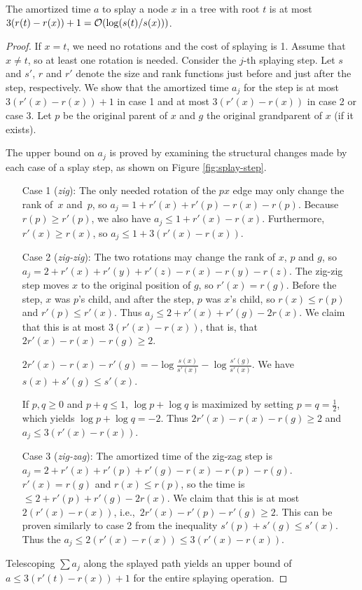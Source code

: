 \begin{lemma}
The amortized time $a$ to splay a node $x$ in a tree with root $t$
is at most $3(r(t)-r(x))+1 = \mathcal{O}(\log(s(t)/s(x)))$.
\end{lemma}
\begin{proof}
If $x=t$, we need no rotations and the cost of splaying is 1.
Assume that  $x\neq t$, so at least one rotation is needed.
Consider the $j$-th splaying step.
Let $s$ and $s'$, $r$ and $r'$ denote the size and rank functions just before
and just after the step, respectively. We show that the amortized time
$a_j$ for the step is at most $3(r'(x)-r(x))+1$ in case 1
and at most $3(r'(x)-r(x))$ in case 2 or case 3. Let $p$ be the original parent
of $x$ and $g$ the original grandparent of $x$ (if it exists).

The upper bound on $a_j$ is proved by examining the structural changes made
by each case of a splay step, as shown on Figure \ref{fig:splay-step}.

\begin{itemize}
\item[Case 1 (\emph{zig}):]
	The only needed rotation of the $px$ edge may only change the rank
	of~$x$ and~$p$, so $a_j=1+r'(x)+r'(p)-r(x)-r(p)$.
	Because $r(p)\geq r'(p)$, we also have $a_j\leq 1+r'(x)-r(x)$.
	Furthermore, $r'(x)\geq r(x)$, so $a_j\leq 1+3(r'(x)-r(x))$.

\item[Case 2 (\emph{zig-zig}):]
	The two rotations may change the rank of $x$, $p$ and $g$,
	so $a_j=2+r'(x)+r'(y)+r'(z)-r(x)-r(y)-r(z)$. The zig-zig step
	moves $x$ to the original position of $g$, so $r'(x)=r(g)$.
	Before the step, $x$ was $p$'s child, and after the step,
	$p$ was $x$'s child, so $r(x)\leq r(p)$ and $r'(p)\leq r'(x)$.
	Thus $a_j\leq 2+r'(x)+r'(g)-2r(x)$.
	We claim that this is at most $3(r'(x)-r(x))$, that is, that
	$2r'(x)-r(x)-r(g)\geq 2$.

	$2r'(x)-r(x)-r'(g)=-\log\frac{s(x)}{s'(x)}-\log\frac{s'(g)}{s'(x)}$.
	We have $s(x)+s'(g)\leq s'(x)$.

	If $p,q\geq 0$ and $p+q\leq 1$, $\log p+\log q$ is maximized
	by setting $p=q=\frac{1}{2}$, which yields $\log p+\log q=-2$.
	Thus $2r'(x)-r(x)-r(g)\geq 2$ and $a_j \leq 3(r'(x)-r(x))$.

\item[Case 3 (\emph{zig-zag}):]
	The amortized time of the zig-zag step is
	$a_j=2+r'(x)+r'(p)+r'(g)-r(x)-r(p)-r(g)$. $r'(x)=r(g)$ and $r(x)\leq r(p)$,
	so the time is $\leq 2+r'(p)+r'(g)-2r(x)$.
	We claim that this is at most $2(r'(x)-r(x))$,
	i.e.,\ $2r'(x)-r'(p)-r'(g)\geq 2$. This can be proven
	similarly to case 2 from the inequality $s'(p)+s'(g)\leq s'(x)$.
	Thus the $a_j \leq 2(r'(x)-r(x))\leq 3(r'(x)-r(x))$.
\end{itemize}

Telescoping $\sum a_j$ along the splayed path yields an upper bound of
$a \leq 3(r'(t)-r(x))+1$ for the entire splaying operation.
\end{proof}

